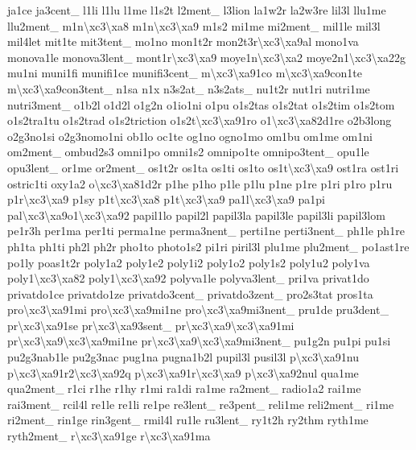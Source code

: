 \begin{DoxyCompactItemize}
ja1ce ja3cent\-\_\- l1li l1lu l1me l1s2t l2ment\-\_\- l3lion la1w2r la2w3re lil3l llu1me llu2ment\-\_\- m1n\textbackslash{}xc3\textbackslash{}xa8 m1n\textbackslash{}xc3\textbackslash{}xa9 m1s2 mi1me mi2ment\-\_\- mil1le mil3l mil4let mit1te mit3tent\-\_\- mo1no mon1t2r mon2t3r\textbackslash{}xc3\textbackslash{}xa9al mono1va monova1le monova3lent\-\_\- mont1r\textbackslash{}xc3\textbackslash{}xa9 moye1n\textbackslash{}xc3\textbackslash{}xa2 moye2n1\textbackslash{}xc3\textbackslash{}xa22g mu1ni muni1fi munifi1ce munifi3cent\-\_\- m\textbackslash{}xc3\textbackslash{}xa91co m\textbackslash{}xc3\textbackslash{}xa9con1te m\textbackslash{}xc3\textbackslash{}xa9con3tent\-\_\- n1sa n1x n3s2at\-\_\- n3s2ats\-\_\- nu1t2r nut1ri nutri1me nutri3ment\-\_\- o1b2l o1d2l o1g2n o1io1ni o1pu o1s2tas o1s2tat o1s2tim o1s2tom o1s2tra1tu o1s2trad o1s2triction o1s2t\textbackslash{}xc3\textbackslash{}xa91ro o1\textbackslash{}xc3\textbackslash{}xa82d1re o2b3long o2g3no1si o2g3nomo1ni ob1lo oc1te og1no ogno1mo om1bu om1me om1ni om2ment\-\_\- ombud2s3 omni1po omni1s2 omnipo1te omnipo3tent\-\_\- opu1le opu3lent\-\_\- or1me or2ment\-\_\- os1t2r os1ta os1ti os1to os1t\textbackslash{}xc3\textbackslash{}xa9 ost1ra ost1ri ostric1ti oxy1a2 o\textbackslash{}xc3\textbackslash{}xa81d2r p1he p1ho p1le p1lu p1ne p1re p1ri p1ro p1ru p1r\textbackslash{}xc3\textbackslash{}xa9 p1sy p1t\textbackslash{}xc3\textbackslash{}xa8 p1t\textbackslash{}xc3\textbackslash{}xa9 pa1l\textbackslash{}xc3\textbackslash{}xa9 pa1pi pal\textbackslash{}xc3\textbackslash{}xa9o1\textbackslash{}xc3\textbackslash{}xa92 papil1lo papil2l papil3la papil3le papil3li papil3lom pe1r3h per1ma per1ti perma1ne perma3nent\-\_\- perti1ne perti3nent\-\_\- ph1le ph1re ph1ta ph1ti ph2l ph2r pho1to photo1s2 pi1ri piril3l plu1me plu2ment\-\_\- po1ast1re po1ly poas1t2r poly1a2 poly1e2 poly1i2 poly1o2 poly1s2 poly1u2 poly1va poly1\textbackslash{}xc3\textbackslash{}xa82 poly1\textbackslash{}xc3\textbackslash{}xa92 polyva1le polyva3lent\-\_\- pri1va privat1do privatdo1ce privatdo1ze privatdo3cent\-\_\- privatdo3zent\-\_\- pro2s3tat pros1ta pro\textbackslash{}xc3\textbackslash{}xa91mi pro\textbackslash{}xc3\textbackslash{}xa9mi1ne pro\textbackslash{}xc3\textbackslash{}xa9mi3nent\-\_\- pru1de pru3dent\-\_\- pr\textbackslash{}xc3\textbackslash{}xa91se pr\textbackslash{}xc3\textbackslash{}xa93sent\-\_\- pr\textbackslash{}xc3\textbackslash{}xa9\textbackslash{}xc3\textbackslash{}xa91mi pr\textbackslash{}xc3\textbackslash{}xa9\textbackslash{}xc3\textbackslash{}xa9mi1ne pr\textbackslash{}xc3\textbackslash{}xa9\textbackslash{}xc3\textbackslash{}xa9mi3nent\-\_\- pu1g2n pu1pi pu1si pu2g3nab1le pu2g3nac pug1na pugna1b2l pupil3l pusil3l p\textbackslash{}xc3\textbackslash{}xa91nu p\textbackslash{}xc3\textbackslash{}xa91r2\textbackslash{}xc3\textbackslash{}xa92q p\textbackslash{}xc3\textbackslash{}xa91r\textbackslash{}xc3\textbackslash{}xa9 p\textbackslash{}xc3\textbackslash{}xa92nul qua1me qua2ment\-\_\- r1ci r1he r1hy r1mi ra1di ra1me ra2ment\-\_\- radio1a2 rai1me rai3ment\-\_\- rcil4l re1le re1li re1pe re3lent\-\_\- re3pent\-\_\- reli1me reli2ment\-\_\- ri1me ri2ment\-\_\- rin1ge rin3gent\-\_\- rmil4l ru1le ru3lent\-\_\- ry1t2h ry2thm ryth1me ryth2ment\-\_\- r\textbackslash{}xc3\textbackslash{}xa91ge r\textbackslash{}xc3\textbackslash{}xa91ma 
\end{DoxyCompactItemize}
